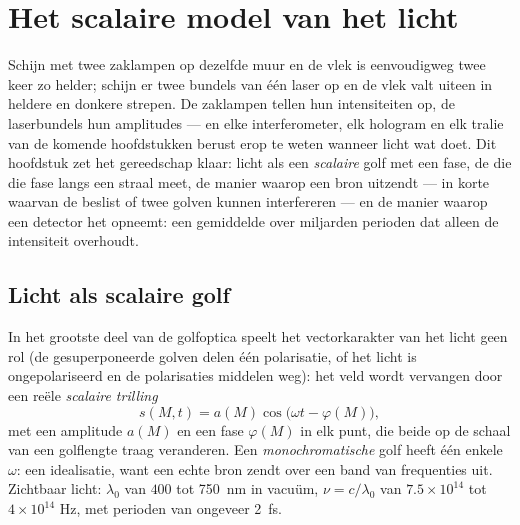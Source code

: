 \chapter{Het scalaire model van het licht}\label{ch:b2:scalar-light-model}

Schijn met twee zaklampen op dezelfde muur en de vlek is eenvoudigweg twee
keer zo helder; schijn er twee bundels van één laser op en de vlek valt
uiteen in heldere en donkere strepen. De zaklampen tellen hun intensiteiten
op, de laserbundels hun amplitudes --- en elke interferometer, elk hologram
en elk tralie van de komende hoofdstukken berust erop te weten wanneer licht
wat doet. Dit hoofdstuk zet het gereedschap klaar: licht als een
\emph{scalaire} golf met een fase, de \emph{} die die fase
langs een straal meet, de manier waarop een bron uitzendt --- in korte
 waarvan de \emph{} beslist of twee golven kunnen
interfereren --- en de manier waarop een detector het opneemt: een
gemiddelde over miljarden perioden dat alleen de intensiteit overhoudt.

\section{Licht als scalaire golf}

\begin{definition}\label{def:b2:scalar-light-model:scalar}
In het grootste deel van de golfoptica speelt het vectorkarakter van het
licht geen rol (de gesuperponeerde golven delen één polarisatie, of het
licht is ongepolariseerd en de polarisaties middelen weg): het veld wordt
vervangen door een reële \emph{scalaire trilling}
\[
s(M, t) = a(M)\cos\bigl(\omega t - \varphi(M)\bigr) ,
\]
met een amplitude $a(M)$ en een fase $\varphi(M)$ in elk punt, die beide op
de schaal van een golflengte traag veranderen. Een \emph{monochromatische}
golf heeft één enkele $\omega$: een idealisatie, want een echte bron zendt
over een band van frequenties uit. Zichtbaar licht: $\lambda_0$ van $400$
tot \qty{750}{nm} in vacuüm, $\nu = c/\lambda_0$ van $7.5 \times 10^{14}$
tot $4 \times 10^{14}$ Hz, met perioden van ongeveer \qty{2}{fs}.
\end{definition}

